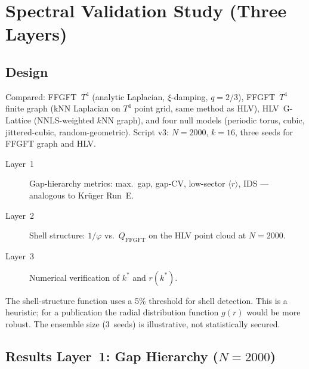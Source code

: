 \section{Spectral Validation Study (Three Layers)}

\subsection{Design}

Compared: FFGFT~$T^4$ (analytic Laplacian, $\xi$-damping, $q=2/3$),
FFGFT~$T^4$ finite graph (kNN Laplacian on $T^4$ point grid, same method
as HLV), HLV~G-Lattice (NNLS-weighted $k$NN graph), and four null models
(periodic torus, cubic, jittered-cubic, random-geometric).
Script v3: $N=2000$, $k=16$, three seeds for FFGFT graph and HLV.

\begin{description}
  \item[Layer~1] Gap-hierarchy metrics: max.\ gap, gap-CV,
    low-sector $\langle r\rangle$, IDS --- analogous to Krüger Run~E.
  \item[Layer~2] Shell structure: $1/\varphi$ vs.\ $Q_\mathrm{FFGFT}$
    on the HLV point cloud at $N=2000$.
  \item[Layer~3] Numerical verification of $k^*$ and $r(k^*)$.
\end{description}

\begin{remark}
The shell-structure function uses a 5\% threshold for shell detection.
This is a heuristic; for a publication the radial distribution function
$g(r)$ would be more robust. The ensemble size (3~seeds) is illustrative,
not statistically secured.
\end{remark}

\subsection{Results Layer~1: Gap Hierarchy ($N=2000$)}

